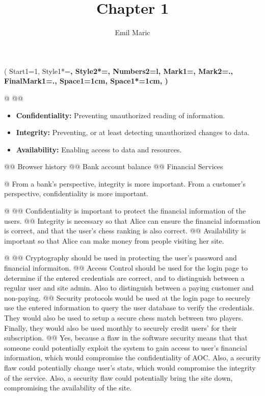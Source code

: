 \documentclass{article}
\begin{document}
\title{Chapter 1}
\author{Emil Maric}
\maketitle

\begin{easylist}
 	\ListProperties(
 		Start1=1,
	  	Style1*=\bfseries,
	  	Style2*=\bfseries,
	  	Numbers2=l,
	  	Mark1={},
	  	Mark2={.},
	  	FinalMark1={.},
	  	Space1=1cm,
	  	Space1*=1cm,
	)
  
 	@
 	@@ \begin{itemize}
 			\item \textbf{Confidentiality:} Preventing unauthorized reading of information.
 			\item \textbf{Integrity:} Preventing, or at least detecting unauthorized changes to data.
 			\item \textbf{Availability:} Enabling access to data and resources.
 		\end{itemize}
 	@@ Browser history
 	@@ Bank account balance
 	@@ Financial Services

 	@ From a bank's perspective, integrity is more important. From a customer's perspective, confidentiality is more important.%
 	
 	@
 	@@ Confidentiality is important to protect the financial information of the users.
 	@@ Integrity is necessary so that Alice can ensure the financial information is correct, and that the user's chess ranking is also correct.
 	@@ Availability is important so that Alice can make money from people visiting her site.
 	
 	@
 	@@ Cryptography should be used in protecting the user's password and financial informaiton.
 	@@ Access Control should be used for the login page to determine if the entered credentials are correct, and to distinguish between a regular user and site admin. Also to distinguish between a paying customer and non-paying.
 	@@ Security protocols would be used at the login page to securely use the entered information to query the user database to verify the credentials. They would also be used to setup a secure chess match between two players. Finally, they would also be used monthly to securely credit users' for their subscription.
 	@@ Yes, because a flaw in the software security means that that someone could potentially exploit the system to gain access to user's financial information, which would compromise the confidentiality of AOC. Also, a security flaw could potentially change user's stats, which would compromise the integrity of the service. Also, a security flaw could potentially bring the site down, compromising the availability of the site.
 

\end{easylist}
\end{document}
